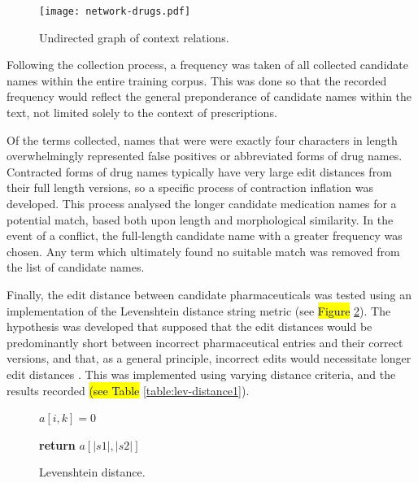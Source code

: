     \begin{figure}[!ht]
      \centering

      \texttt{[image: network-drugs.pdf]}
      
      \caption{Undirected graph of context relations.}
      \label{network-drugs}
   \end{figure}



Following the collection process, a frequency was taken of all collected candidate names within the entire training corpus. This was done so that the recorded frequency would reflect the general preponderance of candidate names within the text, not limited solely to the context of prescriptions.

Of the terms collected, names that were were exactly four characters in length overwhelmingly represented false positives or abbreviated forms of drug names. Contracted forms of drug names typically have very large edit distances from their full length versions, so a specific process of contraction inflation was developed. This process analysed the longer candidate medication names for a potential match, based both upon length and morphological similarity. In the event of a conflict, the full-length candidate name with a greater frequency was chosen. Any term which ultimately found no suitable match was removed from the list of candidate names.

Finally, the edit distance between candidate pharmaceuticals was tested using an implementation of the Levenshtein distance string metric \cite{schulz2002fast} (see \hl{Figure} \ref{euclid}). The hypothesis was developed that supposed that the edit distances would be predominantly short between incorrect pharmaceutical entries and their correct versions, and that, as a general principle, incorrect edits would necessitate longer edit distances \cite{hodge2003comparison}.  This was implemented using varying distance criteria, and the results recorded \hl{(see Table} \ref{table:lev-distance1}).



\begin{figure}
\begin{algorithmic}[1]
\State $a[i,k] =0$
\EndFor
{}
\EndFor
{}
    \Else 
    \EndIf
    \EndFor
\EndFor

\State \textbf{return} $a[|s1|,|s2|]$
\EndProcedure
\end{algorithmic}
\caption{Levenshtein distance.}\label{euclid}
\end{figure}


